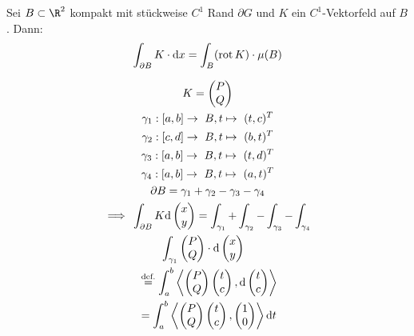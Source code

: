 \begin{satz*}[note = Satz von Green , index = Satz von Green , indexformat = {3!12~ 1!~23}]
	Sei $B \subset \R^2$ kompakt mit stückweise $C^1$ Rand $\partial G$ und $K$ ein $C^1$-Vektorfeld auf $B$. Dann:
	\[ \int_{\partial B} K \cdot \dd x = \int_B (\operatorname{rot} K) \cdot \mu(B) \]
	\begin{bew}[note = für $B$ Rechteck]
		\begin{gather*}
			K = \begin{pmatrix} P \\ Q \end{pmatrix} \\
			\gamma_1 : [a,b] \rightarrow B , t \mapsto (t,c)^T \\
			\gamma_2 : [c,d] \rightarrow B , t \mapsto (b,t)^T \\
			\gamma_3 : [a,b] \rightarrow B , t \mapsto (t,d)^T \\
			\gamma_4 : [a,b] \rightarrow B , t \mapsto (a,t)^T \\
			\partial B = \gamma_1 + \gamma_2 - \gamma_3 - \gamma_4 \\
			\implies \int_{\partial B} K \dd\begin{pmatrix} x \\ y \end{pmatrix} = \int_{\gamma_1} + \int_{\gamma_2} - \int_{\gamma_3} - \int_{\gamma_4} \\
			\begin{split}
				&\qquad \int_{\gamma_1} \begin{pmatrix} P \\ Q \end{pmatrix} \cdot \dd\begin{pmatrix} x \\ y \end{pmatrix} \\
				&\overset{\text{\scriptsize{def.}}}{=} \int_a^b \left\langle \begin{pmatrix} P \\ Q \end{pmatrix} \begin{pmatrix} t \\ c \end{pmatrix} , \dd\begin{pmatrix} t \\ c \end{pmatrix} \right\rangle \\
				&= \int_a^b \left\langle \begin{pmatrix} P \\ Q \end{pmatrix} \begin{pmatrix} t \\ c \end{pmatrix} , \begin{pmatrix} 1 \\ 0 \end{pmatrix} \right\rangle \dd t \\

\end{split}
\end{gather*}
\end{bew}
\end{satz*}
